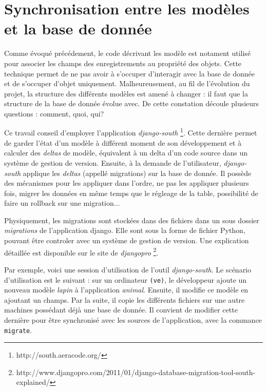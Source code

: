 \documentclass[a4paper,12pt]{article}
\begin{document}
\section{Synchronisation entre les modèles et la base de donnée}

Comme évoqué précédement, le code décrivant les
modèle est notament utilisé pour associer les champs des enregistrements
au propriété des objets. Cette technique permet de ne pas avoir
à s'occuper d'interagir avec la base de donnée et de s'occuper d'objet uniquement.
Malheureusement, au fil de l'évolution du projet, la structure des différents modèles
est amené à changer : il faut que la structure de la base de donnée évolue avec.
De cette constation découle plusieurs questions : comment, quoi, qui?

Ce travail conseil d'employer l'application \textit{django-south}
\footnote{http://south.aeracode.org/}. Cette dernière permet de garder l'état d'un modèle
à différent moment de son développement et à calculer des \textit{deltas} de modèle, équivalent
à un delta d'un code source dans un système de gestion de version. Ensuite,
à la demande de l'utilisateur, \textit{django-south} applique les \textit{deltas}
(appellé migrations) sur la base de donnée. Il possède des mécanismes pour les
appliquer dans l'ordre, ne pas les appliquer plusieurs fois, migrer les
données en même temps que le régleage de la table, possibilité de faire un rollback
sur une migration...

Physiquement, les migrations sont stockées dans des fichiers dans un sous dossier
\textit{migrations} de l'application django. Elle sont sous la forme de fichier
Python, pouvant être controler avec un système de gestion de version. Une explication
détaillée est disponible sur le site de \textit{djangopro}
\footnote{http://www.djangopro.com/2011/01/django-database-migration-tool-south-explained/}.

Par exemple, voici une session d'utilisation de l'outil \textit{django-south}.
Le scénario d'utilisation est le suivant : sur un ordinateur \texttt{(ve)}, le développeur
ajoute un nouveau modèle \textit{lapin} à l'application \textit{animal}. Ensuite,
il modifie ce modèle en ajoutant un champs. Par la suite, il copie les différents
fichiers sur une autre machines possédant déjà une base de donnée. Il convient de
modifier cette dernière pour être synchronisé avec les sources de l'application,
avec la commance \texttt{migrate}.
\end{document}
